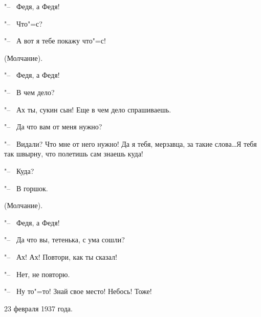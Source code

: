 "--~ Федя, а Федя!

"--~ Что"=с?

"--~ А вот я тебе покажу что"=с!

(Молчание).

"--~ Федя, а Федя!

"--~ В чем дело?

"--~ Ах ты, сукин сын! Еще в чем дело спрашиваешь.

"--~ Да что вам от меня нужно?

"--~ Видали? Что мне от него нужно! Да я тебя, мерзавца, за такие слова\dots Я тебя так швырну, что полетишь сам знаешь куда!

"--~ Куда?
 
"--~ В горшок.

(Молчание).

"--~ Федя, а Федя!

"--~ Да что вы, тетенька, с ума сошли?

"--~ Ах! Ах! Повтори, как ты сказал!

"--~ Нет, не повторю.

"--~ Ну то"=то! Знай свое место! Небось! Тоже!

\begin{flushright}
    23 февраля 1937 года.
\end{flushright}